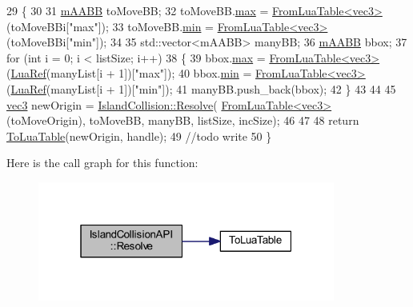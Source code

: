 \begin{DoxyCode}
29 \{
30 
31     \hyperlink{structm_a_a_b_b}{mAABB} toMoveBB;
32     toMoveBB.\hyperlink{structm_a_a_b_b_a9866d0a5a3ceb5dbff2bf87372f3094a}{max} = \hyperlink{_math_a_p_i_8h_a57e551c31a30e104a0c0ca525557f265}{FromLuaTable<vec3>}(toMoveBBi[\textcolor{stringliteral}{"max"}]);
33     toMoveBB.\hyperlink{structm_a_a_b_b_af759d65b18f76e266945883107dcafc8}{min} = \hyperlink{_math_a_p_i_8h_a57e551c31a30e104a0c0ca525557f265}{FromLuaTable<vec3>}(toMoveBBi[\textcolor{stringliteral}{"min"}]);
34 
35     std::vector<mAABB> manyBB;
36     \hyperlink{structm_a_a_b_b}{mAABB} bbox;
37     \textcolor{keywordflow}{for} (\textcolor{keywordtype}{int} i = 0; i < listSize; i++)
38     \{
39         bbox.\hyperlink{structm_a_a_b_b_a9866d0a5a3ceb5dbff2bf87372f3094a}{max} = \hyperlink{_math_a_p_i_8h_a57e551c31a30e104a0c0ca525557f265}{FromLuaTable<vec3>}(\hyperlink{_lua_context_8h_a2220f03700ba40e366f0ee2d684d5c91}{LuaRef}(manyList[i + 1])[\textcolor{stringliteral}{"max"}]);
40         bbox.\hyperlink{structm_a_a_b_b_af759d65b18f76e266945883107dcafc8}{min} = \hyperlink{_math_a_p_i_8h_a57e551c31a30e104a0c0ca525557f265}{FromLuaTable<vec3>}(\hyperlink{_lua_context_8h_a2220f03700ba40e366f0ee2d684d5c91}{LuaRef}(manyList[i + 1])[\textcolor{stringliteral}{"min"}]);
41         manyBB.push\_back(bbox);
42     \}
43 
44 
45     \hyperlink{_types_8h_a3d0ce73e3199de81565fb01632415288}{vec3} newOrigin = \hyperlink{class_island_collision_a13a92119f2cca425c2bc886c0fc7ca75}{IslandCollision::Resolve}(
      \hyperlink{_math_a_p_i_8h_a57e551c31a30e104a0c0ca525557f265}{FromLuaTable<vec3>}(toMoveOrigin), toMoveBB, manyBB, listSize, incSize);
46 
47 
48     \textcolor{keywordflow}{return} \hyperlink{_math_a_p_i_8h_a6d4bdd6987400be64a6a029dbf3e5fb2}{ToLuaTable}(newOrigin, handle);
49     \textcolor{comment}{//todo write}
50 \}
\end{DoxyCode}


Here is the call graph for this function\+:
\nopagebreak
\begin{figure}[H]
\begin{center}
\leavevmode
\includegraphics[width=277pt]{class_island_collision_a_p_i_a423b5b49def4da4c8bd11f471f154944_cgraph}
\end{center}
\end{figure}




